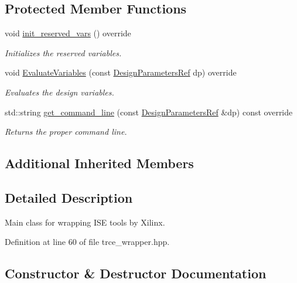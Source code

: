 \subsection*{Protected Member Functions}
\begin{DoxyCompactItemize}
\item 
void \hyperlink{classtrce__wrapper_a2b7b95bfdd4395bcd8bfedabafbb071b}{init\+\_\+reserved\+\_\+vars} () override
\begin{DoxyCompactList}\small\item\em Initializes the reserved variables. \end{DoxyCompactList}\item 
void \hyperlink{classtrce__wrapper_a6a71a4bfee47d27d903b4f70977eb758}{Evaluate\+Variables} (const \hyperlink{DesignParameters_8hpp_ae36bb1c4c9150d0eeecfe1f96f42d157}{Design\+Parameters\+Ref} dp) override
\begin{DoxyCompactList}\small\item\em Evaluates the design variables. \end{DoxyCompactList}\item 
std\+::string \hyperlink{classtrce__wrapper_a0ee76e5b1df405878bf02bc597513e23}{get\+\_\+command\+\_\+line} (const \hyperlink{DesignParameters_8hpp_ae36bb1c4c9150d0eeecfe1f96f42d157}{Design\+Parameters\+Ref} \&dp) const override
\begin{DoxyCompactList}\small\item\em Returns the proper command line. \end{DoxyCompactList}\end{DoxyCompactItemize}
\subsection*{Additional Inherited Members}


\subsection{Detailed Description}
Main class for wrapping I\+SE tools by Xilinx. 

Definition at line 60 of file trce\+\_\+wrapper.\+hpp.



\subsection{Constructor \& Destructor Documentation}
\mbox{\label{classtrce__wrapper_a5ba24404b3a8f27ab07acc5f6a1691ed}} 
